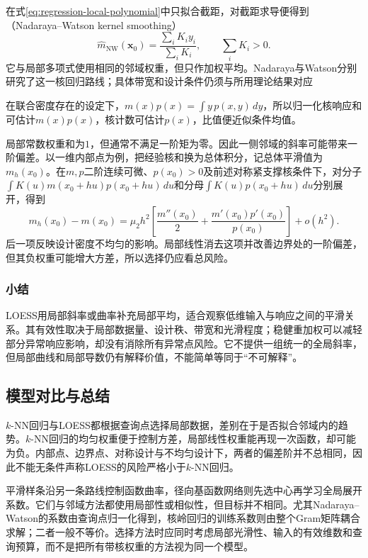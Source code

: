 在式\eqref{eq:regression-local-polynomial}中只拟合截距，对截距求导便得到（Nadaraya--Watson kernel smoothing）
\begin{equation}
  \widehat m_{\mathrm{NW}}(\bm{x}_0)
  =\frac{\sum_iK_i y_i}{\sum_iK_i},
  \qquad \sum_iK_i>0.
  \label{eq:regression-nw}
\end{equation}
它与局部多项式使用相同的邻域权重，但只作加权平均。Nadaraya与Watson分别研究了这一核回归路线；具体带宽和设计条件仍须与所用理论结果对应

在联合密度存在的设定下，$m(x)p(x)=\int y\,p(x,y)\,dy$，所以归一化核响应和可估计$m(x)p(x)$，核计数可估计$p(x)$，比值便近似条件均值。

局部常数权重和为$1$，但通常不满足一阶矩为零。因此一侧邻域的斜率可能带来一阶偏差。以一维内部点为例，把经验核和换为总体积分，记总体平滑值为$m_h(x_0)$。在$m,p$二阶连续可微、$p(x_0)>0$及前述对称紧支撑核条件下，对分子$\int K(u)m(x_0+hu)p(x_0+hu)\,du$和分母$\int K(u)p(x_0+hu)\,du$分别展开，得到
\[
  m_h(x_0)-m(x_0)
  =\mu_2h^2\left[\frac{m''(x_0)}{2}
       +\frac{m'(x_0)p'(x_0)}{p(x_0)}\right]+o(h^2).
\]
后一项反映设计密度不均匀的影响。局部线性消去这项并改善边界处的一阶偏差，但其负权重可能增大方差，所以选择仍应看总风险。

\subsubsection{小结}

LOESS用局部斜率或曲率补充局部平均，适合观察低维输入与响应之间的平滑关系。其有效性取决于局部数据量、设计秩、带宽和光滑程度；稳健重加权可以减轻部分异常响应影响，却没有消除所有异常点风险。它不提供一组统一的全局斜率，但局部曲线和局部导数仍有解释价值，不能简单等同于“不可解释”。

\subsection{模型对比与总结}

$k$-NN回归与LOESS都根据查询点选择局部数据，差别在于是否拟合邻域内的趋势。$k$-NN回归的均匀权重便于控制方差，局部线性权重能再现一次函数，却可能为负。内部点、边界点、对称设计与不均匀设计下，两者的偏差阶并不总相同，因此不能无条件声称LOESS的风险严格小于$k$-NN回归。

平滑样条沿另一条路线控制函数曲率，径向基函数网络则先选中心再学习全局展开系数。它们与邻域方法都使用局部性或相似性，但目标并不相同。尤其Nadaraya--Watson的系数由查询点归一化得到，核岭回归的训练系数则由整个Gram矩阵耦合求解；二者一般不等价。选择方法时应同时考虑局部光滑性、输入的有效维数和查询预算，而不是把所有带核权重的方法视为同一个模型。

